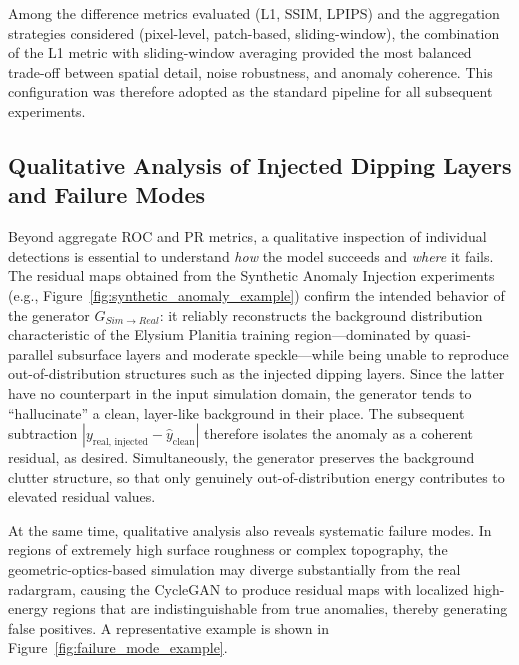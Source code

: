 Among the difference metrics evaluated (L1, SSIM, LPIPS) and the aggregation strategies considered (pixel-level, patch-based, sliding-window), the combination of the L1 metric with sliding-window averaging provided the most balanced trade-off between spatial detail, noise robustness, and anomaly coherence.
This configuration was therefore adopted as the standard pipeline for all subsequent experiments.

\subsection{Qualitative Analysis of Injected Dipping Layers and Failure Modes}
\label{subsec:qualitative_injected_layers}

Beyond aggregate ROC and PR metrics, a qualitative inspection of individual detections is essential to understand \emph{how} the model succeeds and \emph{where} it fails.
The residual maps obtained from the Synthetic Anomaly Injection experiments (e.g., Figure~\ref{fig:synthetic_anomaly_example}) confirm the intended behavior of the generator $G_{Sim \to Real}$: it reliably reconstructs the background distribution characteristic of the Elysium Planitia training region—dominated by quasi-parallel subsurface layers and moderate speckle—while being unable to reproduce out-of-distribution structures such as the injected dipping layers.
Since the latter have no counterpart in the input simulation domain, the generator tends to \enquote{hallucinate} a clean, layer-like background in their place.
The subsequent subtraction $|y_{\text{real, injected}} - \hat{y}_{\text{clean}}|$ therefore isolates the anomaly as a coherent residual, as desired.
Simultaneously, the generator preserves the background clutter structure, so that only genuinely out-of-distribution energy contributes to elevated residual values.

At the same time, qualitative analysis also reveals systematic failure modes.
In regions of extremely high surface roughness or complex topography, the geometric-optics-based simulation may diverge substantially from the real radargram, causing the CycleGAN to produce residual maps with localized high-energy regions that are indistinguishable from true anomalies, thereby generating false positives.
A representative example is shown in Figure~\ref{fig:failure_mode_example}.

